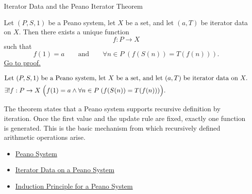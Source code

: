 \begin{topicbox}{Iterator Data and the Peano Iterator Theorem}
\begin{tcolorbox}[colback=thmbox, colframe=thmborder, arc=2pt,
  left=6pt, right=6pt, top=4pt, bottom=4pt,
  title={\small\textbf{Theorem (Peano Iterator Theorem)}},
  fonttitle=\small\bfseries]
\begin{theorem}
\label{thm:peano-iterator-theorem}
Let $(P,S,1)$ be a Peano system, let $X$ be a set, and let $(a,T)$ be iterator
data on $X$. Then there exists a unique function
\[
f : P \to X
\]
such that
\[
f(1)=a
\qquad\text{and}\qquad
\forall n \in P\;(f(S(n))=T(f(n))).
\]
\hyperref[prf-peano-iterator-theorem]{Go to proof.}
\end{theorem}
\end{tcolorbox}

\begin{remark*}
\[
\begin{aligned}
&\text{Let } (P,S,1) \text{ be a Peano system, let } X \text{ be a set, and let } (a,T) \text{ be iterator data on } X.\\
&\exists! f : P \to X\;
\Bigl(f(1)=a \land
\forall n \in P\;(f(S(n))=T(f(n)))\Bigr).
\end{aligned}
\]
\end{remark*}

\begin{remark*}[Interpretation]
The theorem states that a Peano system supports recursive definition by
iteration. Once the first value and the update rule are fixed, exactly one
function is generated. This is the basic mechanism from which recursively
defined arithmetic operations arise.
\end{remark*}

\begin{remark*}[Dependencies]
\begin{itemize}
  \item \hyperref[def:peano-system]{Peano System}
  \item \hyperref[def:iterator-data-on-peano-system]{Iterator Data on a Peano System}
  \item \hyperref[thm:induction-principle-for-peano-system]{Induction Principle for a Peano System}
\end{itemize}
\end{remark*}
\end{topicbox}

